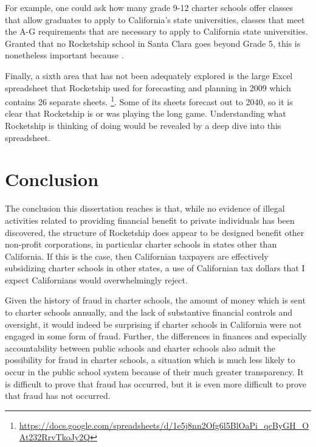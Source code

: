 For example, one could ask how many grade 9-12 charter schools offer classes that allow graduates to apply to California's state universities, classes that meet the A-G requirements that are necessary to apply to California state universities. Granted that no Rocketship school in Santa Clara goes beyond Grade 5, this is nonetheless important because . 

Finally, a sixth area that has not been adequately explored is the large Excel spreadsheet that Rocketship used for forecasting and planning in 2009 which contains 26 separate sheets. \footnote{\url{https://docs.google.com/spreadsheets/d/1e5j8nn2Ofg6l5BlOaPi_qcByGH_OAt232RrvTkoJy2Q}}. Some of its sheets forecast out to 2040, so it is clear that Rocketship is or was playing the long game. Understanding what Rocketship is thinking of doing would be revealed by a deep dive into this spreadsheet.

\section{Conclusion}%
\label{sec:conclusion}%

The conclusion this dissertation reaches is that, while no evidence of illegal activities related to providing financial benefit to private individuals has been discovered, the structure of Rocketship does appear to be designed benefit other non-profit corporations, in particular charter schools in states other than California. If this is the case, then Californian taxpayers are effectively subsidizing charter schools in other states, a use of Californian tax dollars that I expect Californians would overwhelmingly reject.

Given the history of fraud in charter schools, the amount of money which is sent to charter schools annually, and the lack of substantive financial controls and oversight, it would indeed be surprising if charter schools in California were not engaged in some form of fraud. Further, the differences in finances and especially accountability between public schools and charter schools also admit the possibility for fraud in charter schools, a situation which is much less likely to occur in the public school system because of their much greater transparency. It is difficult to prove that fraud has occurred, but it is even more difficult to prove that fraud has not occurred. 

